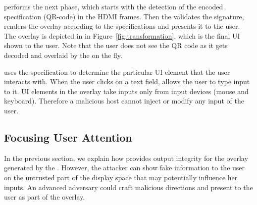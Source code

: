 

 \device performs the next phase, which starts with the detection of the encoded specification (QR-code) in the HDMI frames. Then the \device validates the signature, renders the overlay according to the specifications and presents it to the user.  The \device overlay is depicted in \three in Figure~\ref{fig:transformation}, which is the final UI shown to the user. Note that the user does not see the QR code as it gets decoded and overlaid by the \device on the fly.

\device uses the specification to determine the particular UI element that the user interacts with. When the user clicks on a text field, \device allows the user to type input to it. UI elements in the overlay take inputs only from input devices (mouse and keyboard). Therefore a malicious host cannot inject or modify any input of the user.

\subsection{Focusing User Attention}
\label{sec:systemDesign:userAttention}

In the previous section, we explain how \name provides output integrity for the overlay generated by the \device. However, the attacker can show fake information to the user on the untrusted part of the display space that may potentially influence her inputs. An advanced adversary could craft malicious directions and present to the user as part of the overlay.

